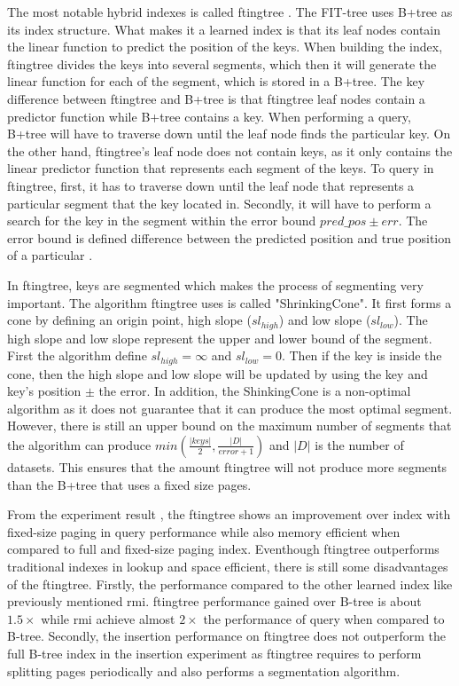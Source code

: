 The most notable hybrid indexes is called \acrshort{ftingtree} \cite{fittingtree}. The FIT-tree uses B+tree as its index structure. What makes it a learned index is that its leaf nodes contain the linear function to predict the position of the keys. When building the index, \acrshort{ftingtree} divides the keys into several segments, which then it will generate the linear function for each of the segment, which is stored in a B+tree. The key difference between \acrshort{ftingtree} and B+tree is that \acrshort{ftingtree} leaf nodes contain a predictor function while B+tree contains a key. When performing a query, B+tree will have to traverse down until the leaf node finds the particular key. On the other hand, \acrshort{ftingtree}'s leaf node does not contain keys, as it only contains the linear predictor function that represents each segment of the keys. To query in \acrshort{ftingtree}, first, it has to traverse down until the leaf node that represents a particular segment that the key located in. Secondly, it will have to perform a search for the key in the segment within the error bound $pred\_pos \pm err$. The error bound is defined difference between the predicted position and true position of a particular \cite{fittingtree}. 

In \acrshort{ftingtree}, keys are segmented which makes the process of segmenting very important. The algorithm \acrshort{ftingtree} uses is called "\textsf{ShrinkingCone}". It first forms a cone by defining an origin point, high slope ($sl_{high}$) and low slope ($sl_{low}$). The high slope and low slope represent the upper and lower bound of the segment. First the algorithm define $sl_{high} = \infty$ and $sl_{low} = 0$. Then if the key is inside the cone, then the high slope and low slope will be updated by using the key and key's position $\pm$ the \textsf{error}. In addition, the \textsf{ShinkingCone} is a non-optimal algorithm as it does not guarantee that it can produce the most optimal segment. However, there is still an upper bound on the maximum number of segments that the algorithm can produce $min(\frac{|keys|}{2}, \frac{|D|}{error+1})$ and $|D|$ is the number of datasets. This ensures that the amount \acrshort{ftingtree} will not produce more segments than the B+tree that uses a fixed size pages\cite{fittingtree}. 

From the experiment result \cite{fittingtree}, the \acrshort{ftingtree} shows an improvement over index with fixed-size paging in query performance while also memory efficient when compared to full and fixed-size paging index. Eventhough \acrshort{ftingtree} outperforms traditional indexes in lookup and space efficient, there is still some disadvantages of the \acrshort{ftingtree}. Firstly, the performance compared to the other learned index like previously mentioned \acrshort{rmi}. \acrshort{ftingtree} performance gained over B-tree is about $1.5\times$ while \acrshort{rmi} achieve almost $2\times$ the performance of query when compared to B-tree. Secondly, the insertion performance on \acrshort{ftingtree} does not outperform the full B-tree index in the insertion experiment \cite{fittingtree} as \acrshort{ftingtree} requires to perform splitting pages periodically and also performs a segmentation algorithm. 

